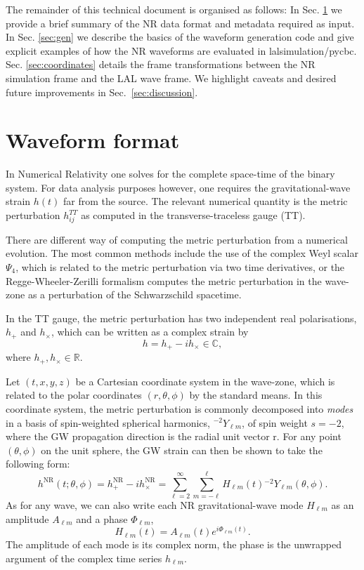 \documentclass[aps,prd,amssymb,amsmath,amsfonts,superscriptaddress,
floatfix ,preprintnumbers,altaffilletter]{revtex4}
\begin{document}
The remainder of this technical document is organised as follows: In Sec. \ref{sec:format} we provide a brief summary
of the NR data format and metadata required as input. In Sec. \ref{sec:gen} we describe the basics of the waveform generation code and give explicit examples of how the NR waveforms are evaluated in lalsimulation/pycbc. Sec. \ref{sec:coordinates} details the frame transformations between the NR simulation frame and the LAL wave frame. We highlight caveats and desired future improvements in Sec.~\ref{sec:discussion}.

\section{Waveform format}
\label{sec:format}
In Numerical Relativity one solves for the complete space-time of the binary system. For data analysis
purposes however, one requires the gravitational-wave strain $h(t)$ far from the source. The relevant numerical quantity
is the metric perturbation $h^{TT}_{ij}$ as computed in the transverse-traceless gauge (TT). 

There are different way of computing the metric perturbation from a numerical evolution. The most common methods include
the use of the complex Weyl scalar $\Psi_4$, which is related to the metric perturbation via two time derivatives, or the
Regge-Wheeler-Zerilli formalism computes the metric perturbation in the wave-zone as a perturbation of the Schwarzschild
spacetime. 

In the TT gauge, the metric perturbation
has two independent real polarisations, $h_+$ and $h_\times$, which can be written as a complex strain by
\begin{equation}
\label{ }
h = h_+ - i h_\times \in \mathbb{C},
\end{equation}
where $h_+, h_\times \in \mathbb{R}$.

Let $(t,x,y,z)$ be a Cartesian coordinate system in the wave-zone, which is related to the polar coordinates $(r, \theta, \phi)$ by the standard means. In this coordinate system, the metric perturbation is commonly decomposed into \emph{modes}
in a basis of spin-weighted spherical harmonics, ${}^{-2}Y_{\ell m}$, of spin weight $s=-2$, where the GW propagation direction is
the radial unit vector r.
For any point $(\theta, \phi)$ on the unit sphere, the GW strain can then be shown to take the following form:
\begin{equation}
\label{ }
h^\mathrm{NR}(t; \theta, \phi) = h^\mathrm{NR}_+ - i h^\mathrm{NR}_\times = \sum_{\ell=2}^\infty \sum_{m=-\ell}^{\ell} H_{\ell m}(t) {}^{-2}Y_{\ell m}(\theta,\phi).
\end{equation}
As for any wave, we can also write each NR gravitational-wave mode $H_{\ell m}$ as an amplitude $A_{\ell m}$ and a phase
$\Phi_{\ell m}$,
\begin{equation}
\label{ }
H_{\ell m}(t) = A_{\ell m}(t)e^{i\Phi_{\ell m}(t)}.
\end{equation}
The amplitude of each mode is its complex norm, the phase is the unwrapped argument of the complex time series $h_{\ell m}$. 
\end{document}
